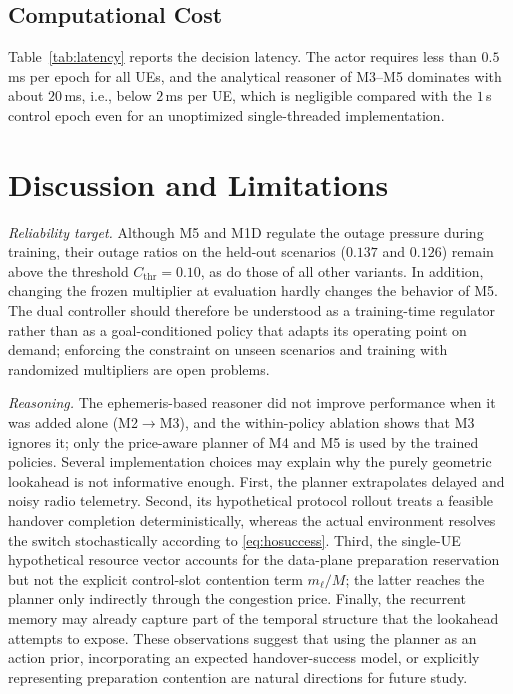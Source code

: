 \documentclass[journal]{IEEEtran}
\begin{document}
\subsection{Computational Cost}
Table~\ref{tab:latency} reports the decision latency. The actor requires
less than $0.5$\,ms per epoch for all UEs, and the analytical reasoner of
M3--M5 dominates with about $20$\,ms, i.e., below $2$\,ms per UE, which is
negligible compared with the $1$\,s control epoch even for an unoptimized
single-threaded implementation.

\section{Discussion and Limitations}
\label{sec:limitations}

\emph{Reliability target.} Although M5 and M1D regulate the outage pressure
during training, their outage ratios on the held-out scenarios ($0.137$ and
$0.126$) remain above the threshold $C_{\mathrm{thr}}=0.10$, as do those of
all other variants. In addition,
changing the frozen multiplier at evaluation hardly changes the behavior of
M5. The dual controller should therefore be understood as a training-time
regulator rather than as a goal-conditioned policy that adapts its operating
point on demand; enforcing the constraint on unseen scenarios and training
with randomized multipliers are open problems.

\emph{Reasoning.} The ephemeris-based reasoner did not improve performance
when it was added alone (M2$\to$M3), and the within-policy ablation shows that
M3 ignores it; only the price-aware planner of M4 and M5 is used by the
trained policies. Several implementation choices may explain why the purely
geometric lookahead is not informative enough.
First, the planner extrapolates delayed and noisy radio telemetry. Second, its
hypothetical protocol rollout treats a feasible handover completion
deterministically, whereas the actual environment resolves the switch
stochastically according to \eqref{eq:hosuccess}. Third, the single-UE
hypothetical resource vector accounts for the data-plane preparation
reservation but not the explicit control-slot contention term
$m_\ell/M$; the latter reaches the planner only indirectly
through the congestion price. Finally, the recurrent memory may already capture
part of the temporal structure that the lookahead attempts to expose. These
observations suggest that using the planner as an action prior, incorporating an
expected handover-success model, or explicitly representing preparation
contention are natural directions for future study.
\end{document}
